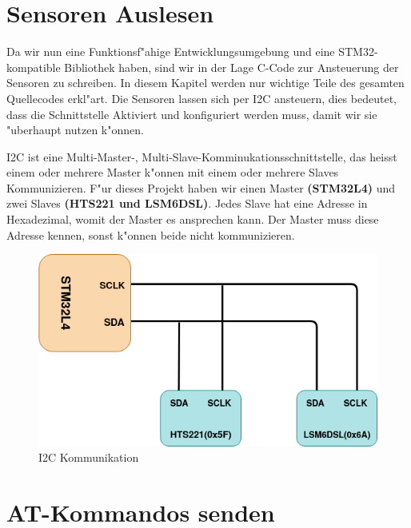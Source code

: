 \section{Sensoren Auslesen} \label{Sensoren}

Da wir nun eine Funktionsf"ahige Entwicklungsumgebung und eine 
STM32-kompatible Bibliothek haben, sind wir in der Lage C-Code zur 
Ansteuerung der Sensoren zu schreiben. In diesem Kapitel werden nur 
wichtige Teile des gesamten Quellecodes erkl"art. Die Sensoren lassen 
sich per I2C ansteuern, dies bedeutet, dass die Schnittstelle Aktiviert 
und konfiguriert werden muss, damit wir sie "uberhaupt nutzen k"onnen. 

I2C ist eine Multi-Master-, Multi-Slave-Komminukationsschnittstelle, 
das heisst einem oder mehrere Master k"onnen mit einem oder mehrere 
Slaves  Kommunizieren. F"ur dieses Projekt haben wir einen Master 
\textbf{(STM32L4)} und zwei Slaves  \textbf{(HTS221 und LSM6DSL)}. 
Jedes Slave hat eine Adresse in Hexadezimal, womit der Master es 
ansprechen kann. Der Master muss diese Adresse kennen, sonst k"onnen beide nicht kommunizieren. 

\begin{figure}[h]
	\centering
	\includegraphics[width=13cm]{source/images/I2C}
	\caption{I2C Kommunikation\label{fig:I2C}}
\end{figure}



\section{AT-Kommandos senden}
